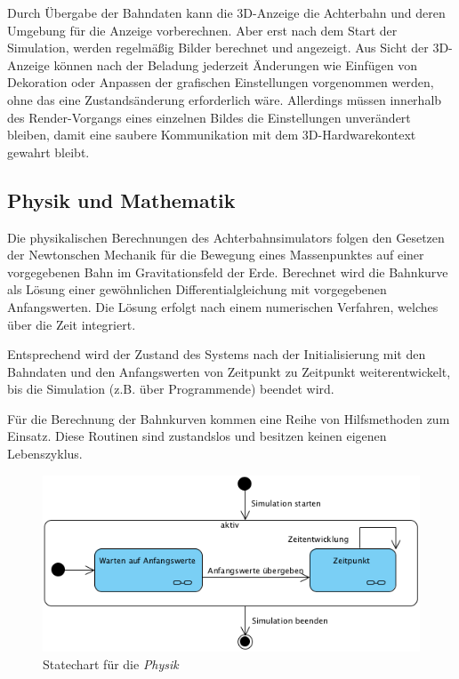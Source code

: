 Durch Übergabe der Bahndaten kann die 3D-Anzeige die Achterbahn und deren Umgebung für die Anzeige vorberechnen.
Aber erst nach dem Start der Simulation, werden regelmäßig Bilder berechnet und angezeigt. Aus Sicht der 3D-Anzeige
können nach der Beladung jederzeit Änderungen wie Einfügen von Dekoration oder Anpassen der grafischen Einstellungen
vorgenommen werden, ohne das eine Zustandsänderung erforderlich wäre. Allerdings müssen innerhalb des Render-Vorgangs
eines einzelnen Bildes die Einstellungen unverändert bleiben, damit eine saubere Kommunikation mit dem 3D-Hardwarekontext
gewahrt bleibt.

\subsection{Physik und Mathematik}

Die physikalischen Berechnungen des Achterbahnsimulators folgen den Gesetzen der Newtonschen Mechanik für die Bewegung
eines Massenpunktes auf einer vorgegebenen Bahn im Gravitationsfeld der Erde. Berechnet wird die Bahnkurve als Lösung
einer gewöhnlichen Differentialgleichung mit vorgegebenen Anfangswerten. Die Lösung erfolgt nach einem numerischen
Verfahren, welches über die Zeit integriert.

Entsprechend wird der Zustand des Systems nach der Initialisierung mit den Bahndaten und den Anfangswerten von Zeitpunkt
zu Zeitpunkt weiterentwickelt, bis die Simulation (z.B. über Programmende) beendet wird.

Für die Berechnung der Bahnkurven kommen eine Reihe von Hilfsmethoden zum Einsatz. Diese Routinen sind zustandslos und
besitzen keinen eigenen Lebenszyklus.

\begin{figure}
\includegraphics[width=\linewidth]{bilder/statechart_physics}
\caption{Statechart für die \textit{Physik}}
\end{figure}
